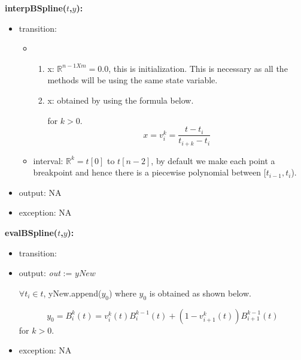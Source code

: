 \documentclass[12pt, titlepage]{article}
\begin{document}
\noindent \textbf{interpBSpline($t$,$y$):}
\begin{itemize}
	\item transition: 
	
		\begin{itemize}
		\item 
		\begin{enumerate}
			\item x: $\mathbb{R}^{n-1 X m} = 0.0 $, this is initialization. 
			This is necessary as all the methods will be using the same state 
			variable.
			
			\item x: obtained by using the formula below.
			
			for $k>0$.
			\begin{equation*}
			x = v_i ^k = \frac{t-t_i}{t_{i+k} - t_i}
			\end{equation*}
			
			
		\end{enumerate}
		\item interval: $\mathbb{R}^{k} = t[0] $ to $t[n-2]$, by default we 
		make each point a breakpoint and hence there is a piecewise polynomial 
		between [$t_{i-1},t_i$).
	\end{itemize}
	
	
	 
	\item output: NA 	
	 
	\item exception: NA 
\end{itemize}


\noindent \textbf{evalBSpline($t$,$y$):}
\begin{itemize}
	\item transition: 
	
	\item output:  \textit{out} := $yNew$
	
	$\forall t_i \in t$, yNew.append($y_0$) where $y_0$ is obtained as shown 
	below.
	
	\begin{equation*}
	y_0 = B_i ^k (t) = v_i ^k (t) B_i ^{k-1} (t) + (1 - v_{i+1} ^k (t))B_{i+1} 
	^{k-1} 
	(t)
	\end{equation*} 
	for $k>0$.\\
	\item exception: NA
\end{itemize}
\end{document}
